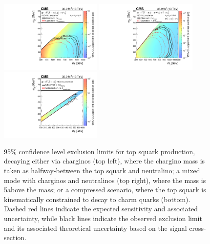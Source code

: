 \begin{figure}
	\centering
	\includegraphics[width=0.45\textwidth]{results/figs/interpretations/T2bW_35p9ifb_Moriond2017_Mar07_XSEC}
	\includegraphics[width=0.45\textwidth]{results/figs/interpretations/T2bt_35p9ifb_Moriond2017_Mar07_XSEC}
	\includegraphics[width=0.45\textwidth]{results/figs/interpretations/T2cc_35p9ifb_Moriond2017_Mar07_XSEC}
	\renewcommand{\baselinestretch}{1.0}
	\caption[95\% confidence level exclusion limits for top squark production.]{95\% confidence level exclusion limits for top squark production, decaying either via charginos (top left), where the chargino mass is taken as halfway-between the top squark and neutralino; a mixed mode with charginos and neutralinos (top right), where the \chipm mass is 5\GeV above the \lsp mass; or a compressed scenario, where the top squark is kinematically constrained to decay to charm quarks (bottom).  Dashed red lines indicate the expected sensitivity and associated uncertainty, while black lines indicate the observed exclusion limit and its associated theoretical uncertainty based on the signal cross-section.}
	\label{fig:limitsStop}
\end{figure}

